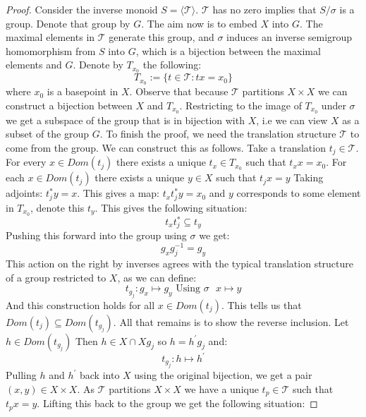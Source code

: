 \begin{corollary}
\begin{proof}
Consider the inverse monoid $S = \langle \mathcal{T} \rangle$. $\mathcal{T}$ has no zero implies that $S/\sigma$ is a group. Denote that group by $G$. The aim now is to embed $X$ into $G$. The maximal elements in $\mathcal{T}$ generate this group, and $\sigma$ induces an inverse semigroup homomorphism from $S$ into $G$, which is a bijection between the maximal elements and $G$. Denote by $T_{x_{0}}$ the following:
\begin{equation}
T_{x_{0}} := \lbrace t \in \mathcal{T} : tx=x_{0} \rbrace
\end{equation}
where $x_{0}$ is a basepoint in $X$. Observe that because $\mathcal{T}$ partitions $X \times X$ we can construct a bijection between $X$ and $T_{x_{0}}$. Restricting to the image of $T_{x_{0}}$ under $\sigma$ we get a subspace of the group that is in bijection with $X$, i.e we can view $X$ as a subset of the group $G$. To finish the proof, we need the translation structure $\mathcal{T}$ to come from the group. We can construct this as follows. Take a translation $t_{j} \in \mathcal{T}$. For every $x \in Dom(t_{j})$ there exists a unique $t_{x} \in T_{x_{0}}$ such that $t_{x}x=x_{0}$. For each $x \in Dom(t_{j})$ there exists a unique $y \in X$ such that $t_{j}x=y$ Taking adjoints: $t_{j}^{*}y=x$. This gives a map: $t_{x}t_{j}^{*}y=x_{0}$ and $y$ corresponds to some element in $T_{x_{0}}$, denote this $t_{y}$. This gives the following situation:
\begin{equation}
t_{x}t_{j}^{*} \subseteq t_{y}
\end{equation} 
Pushing this forward into the group using $\sigma$ we get:
\begin{equation}
g_{x}g_{j}^{-1}=g_{y}
\end{equation}
This action on the right by inverses agrees with the typical translation structure of a group restricted to $X$, as we can define:
\begin{equation}
t_{g_{j}}:g_{x} \mapsto g_{y} \mbox{ Using $\sigma$ } x \mapsto y
\end{equation}
And this construction holds for all $x\in Dom(t_{j})$. This tells us that $Dom(t_{j}) \subseteq Dom(t_{g_{j}})$. All that remains is to show the reverse inclusion. Let $h \in Dom(t_{g_{j}})$ Then $h \in X \cap Xg_{j}$ so $h=h^{'}g_{j}$ and:
\begin{equation}
t_{g_{j}}:h \mapsto h^{'}
\end{equation}
Pulling $h$ and $h^{'}$ back into $X$ using the original bijection, we get a pair $(x,y) \in X \times X$. As $\mathcal{T}$ partitions $X\times X$ we have a unique $t_{p} \in \mathcal{T}$ such that $t_{p}x=y$. Lifting this back to the group we get the following situation:

\end{proof}
\end{corollary}
